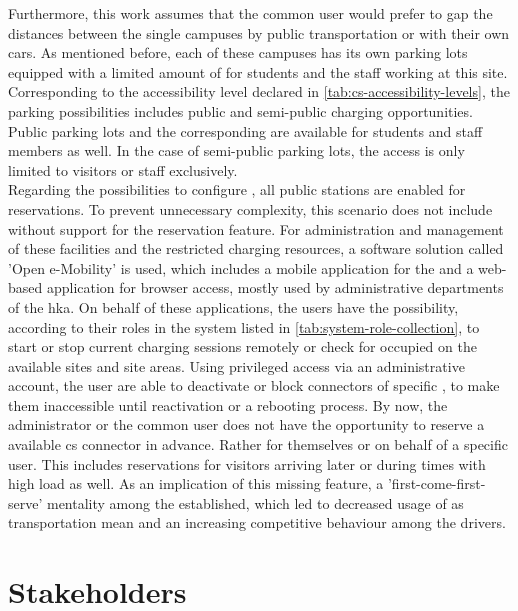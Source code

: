\noindent Furthermore, this work assumes that the common user would prefer to gap the distances between the single campuses by public transportation or with their own cars.
As mentioned before, each of these campuses has its own parking lots equipped with a limited amount of  for students and the staff working at this site. Corresponding to the accessibility level declared in \ref{tab:cs-accessibility-levels}, the parking possibilities includes public and semi-public charging opportunities.
Public parking lots and the corresponding  are available for students and staff members as well. In the case of semi-public parking lots, the access is only limited to visitors or staff exclusively. \\
Regarding the possibilities to configure , all public stations are enabled for reservations. To prevent unnecessary complexity, this scenario does not include  without support for the reservation feature.
For administration and management of these facilities and the restricted charging resources, a software solution called 'Open e-Mobility' \cite{noauthor_github_nodate,noauthor_github_nodate-1,noauthor_github_nodate-3} is used, which includes a mobile application for the  and a web-based application for browser access, mostly used by administrative departments of the \acrshort{hka}. 
On behalf of these applications, the users have the possibility, according to their roles in the system listed in \ref{tab:system-role-collection}, to start or stop current charging sessions remotely or check for occupied  on the available sites and site areas.
Using privileged access via an administrative account, the user are able to deactivate or block connectors of specific , to make them inaccessible until reactivation or a rebooting process.
By now, the administrator or the common user does not have the opportunity to reserve a available \acrshort{cs} connector in advance. Rather for themselves or on behalf of a specific user. This includes reservations for visitors arriving later or during times with high load as well.
As an implication of this missing feature, a 'first-come-first-serve' mentality among the  established, which led to decreased usage of  as transportation mean and an increasing competitive behaviour among the drivers.

\section{Stakeholders}
\label{ch:Requirements Engineering:sec:Stakeholders}

